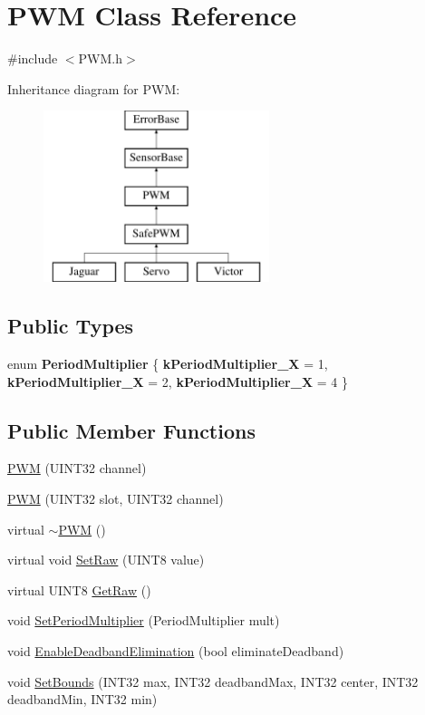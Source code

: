 \hypertarget{classPWM}{\section{\-P\-W\-M \-Class \-Reference}
\label{classPWM}
}


{\ttfamily \#include $<$\-P\-W\-M.\-h$>$}

\-Inheritance diagram for \-P\-W\-M\-:\begin{figure}[H]
\begin{center}
\leavevmode
\includegraphics[height=5.000000cm]{classPWM}
\end{center}
\end{figure}
\subsection*{\-Public \-Types}
\begin{DoxyCompactItemize}
\item 
enum {\bfseries \-Period\-Multiplier} \{ {\bfseries k\-Period\-Multiplier\-\_\-X} =  1, 
{\bfseries k\-Period\-Multiplier\-\_\-X} =  2, 
{\bfseries k\-Period\-Multiplier\-\_\-X} =  4
 \}
\end{DoxyCompactItemize}
\subsection*{\-Public \-Member \-Functions}
\begin{DoxyCompactItemize}
\item 
\hyperlink{classPWM_aa96fde4003a2ee8c57f90019b2504009}{\-P\-W\-M} (\-U\-I\-N\-T32 channel)
\item 
\hyperlink{classPWM_aeded1d00b096610b78ce79a21cdaa2b8}{\-P\-W\-M} (\-U\-I\-N\-T32 slot, \-U\-I\-N\-T32 channel)
\item 
virtual \hyperlink{classPWM_a903377c1da3618530f999d77297406af}{$\sim$\-P\-W\-M} ()
\item 
virtual void \hyperlink{classPWM_ae0916ef0dec0ad1e7793a16d3d6c42c3}{\-Set\-Raw} (\-U\-I\-N\-T8 value)
\item 
virtual \-U\-I\-N\-T8 \hyperlink{classPWM_a4fe28ee13017aa4c6b9b8fa662ebf99e}{\-Get\-Raw} ()
\item 
void \hyperlink{classPWM_a274fbac1ce527d1b08fab2ef4d66c35b}{\-Set\-Period\-Multiplier} (\-Period\-Multiplier mult)
\item 
void \hyperlink{classPWM_a9e3edb95ce8aefe94e2d0827798e62a1}{\-Enable\-Deadband\-Elimination} (bool eliminate\-Deadband)
\item 
void \hyperlink{classPWM_a57047fe0445577e94cebad0aa96165be}{\-Set\-Bounds} (\-I\-N\-T32 max, \-I\-N\-T32 deadband\-Max, \-I\-N\-T32 center, \-I\-N\-T32 deadband\-Min, \-I\-N\-T32 min)
\end{DoxyCompactItemize}
